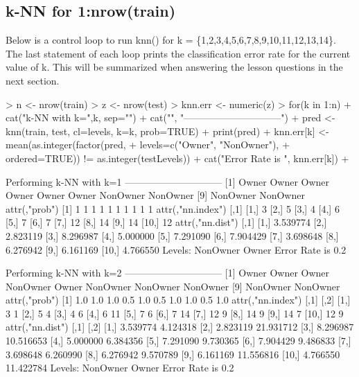 \documentclass{article}
\begin{document}
\subsection*{k-NN for 1:nrow(train)}
Below is a control loop to run knn() for k = \{1,2,3,4,5,6,7,8,9,10,11,12,13,14\}. 
The last statement of each loop prints the classification error rate for the current value of k. This will be summarized when answering the lesson questions in the next section. 
\begin{Schunk}
\begin{Sinput}
> n <- nrow(train)
> z <- nrow(test)
> knn.err <- numeric(z)
> for(k in 1:n) {
+     cat("\n\nPerforming k-NN with k=",k, sep="")
+     cat("\n", "------------------------------\n")
+     pred <- knn(train, test, cl=levels, k=k, prob=TRUE)
+     print(pred)
+     knn.err[k] <- mean(as.integer(factor(pred, 
+                                          levels=c("Owner", "NonOwner"), 
+                                          ordered=TRUE)) != as.integer(testLevels))
+     cat("Error Rate is ", knn.err[k])
+ }
\end{Sinput}
\begin{Soutput}
Performing k-NN with k=1
 ------------------------------
 [1] Owner    Owner    Owner    Owner    Owner    Owner    NonOwner NonOwner
 [9] NonOwner NonOwner
attr(,"prob")
 [1] 1 1 1 1 1 1 1 1 1 1
attr(,"nn.index")
      [,1]
 [1,]    3
 [2,]    5
 [3,]    4
 [4,]    6
 [5,]    7
 [6,]    7
 [7,]   12
 [8,]   14
 [9,]   14
[10,]   12
attr(,"nn.dist")
          [,1]
 [1,] 3.539774
 [2,] 2.823119
 [3,] 8.296987
 [4,] 5.000000
 [5,] 7.291090
 [6,] 7.904429
 [7,] 3.698648
 [8,] 6.276942
 [9,] 6.161169
[10,] 4.766550
Levels: NonOwner Owner
Error Rate is  0.2

Performing k-NN with k=2
 ------------------------------
 [1] Owner    Owner    Owner    NonOwner Owner    NonOwner NonOwner NonOwner
 [9] NonOwner NonOwner
attr(,"prob")
 [1] 1.0 1.0 1.0 0.5 1.0 0.5 1.0 1.0 0.5 1.0
attr(,"nn.index")
      [,1] [,2]
 [1,]    3    1
 [2,]    5    4
 [3,]    4    6
 [4,]    6   11
 [5,]    7    6
 [6,]    7   14
 [7,]   12    9
 [8,]   14    9
 [9,]   14    7
[10,]   12    9
attr(,"nn.dist")
          [,1]      [,2]
 [1,] 3.539774  4.124318
 [2,] 2.823119 21.931712
 [3,] 8.296987 10.516653
 [4,] 5.000000  6.384356
 [5,] 7.291090  9.730365
 [6,] 7.904429  9.486833
 [7,] 3.698648  6.260990
 [8,] 6.276942  9.570789
 [9,] 6.161169 11.556816
[10,] 4.766550 11.422784
Levels: NonOwner Owner
Error Rate is  0.2


\end{Soutput}
\end{Schunk}
\end{document}
